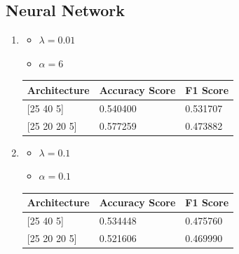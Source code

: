 \documentclass[letterpaper]{article}
\begin{document}
\subsection*{Neural Network}
\begin{enumerate}[label=(\alph*)]
	\item \begin{itemize}
		      \item $\lambda = 0.01$
		      \item $\alpha = 6$
	      \end{itemize}

	      \begin{table}[H]
		      \centering
		      \begin{tabular}{|l|l|l|}
			      \hline
			      Architecture     & Accuracy Score & F1 Score \\ \hline
			      {[}25 40 5{]}    & 0.540400       & 0.531707 \\ \hline
			      {[}25 20 20 5{]} & 0.577259       & 0.473882 \\ \hline
		      \end{tabular}
	      \end{table}
	\item \begin{itemize}
		      \item $\lambda = 0.1$
		      \item $\alpha = 0.1$
	      \end{itemize}

	      \begin{table}[H]
		      \centering
		      \begin{tabular}{|l|l|l|}
			      \hline
			      Architecture     & Accuracy Score & F1 Score \\ \hline
			      {[}25 40 5{]}    & 0.534448       & 0.475760 \\ \hline
			      {[}25 20 20 5{]} & 0.521606       & 0.469990 \\ \hline
		      \end{tabular}
	      \end{table}
\end{enumerate}
\end{document}
